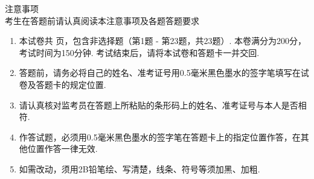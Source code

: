 \documentclass[12pt,space]{ctexart} %
\begin{document}
\juemi%
{\centering\heiti 注意事项 \\}
{\heiti 考生在答题前请认真阅读本注意事项及各题答题要求}
\begin{enumerate}[itemsep=-0.3em,topsep=0pt]
\item 本试卷共 \pageref{LastPage} 页，包含非选择题（第1题 - 第23题，共23题）. 本卷满分为200分，考试时间为150分钟. 考试结束后，请将本试卷和答题卡一并交回. 
\item 答题前，请务必将自己的姓名、准考证号用0.5毫米黑色墨水的签字笔填写在试卷及答题卡的规定位置. 
\item 请认真核对监考员在答题上所粘贴的条形码上的姓名、准考证号与本人是否相符. 
\item 作答试题，必须用0.5毫米黑色墨水的签字笔在答题卡上的指定位置作答，在其他位置作答一律无效. 
\item 如需改动，须用2B铅笔绘、写清楚，线条、符号等须加黑、加粗. 
\end{enumerate}
\end{document}
